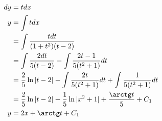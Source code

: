 \begin{align*}
    dy & = tdx                                                                          \\
    y  & = \int t dx                                                                    \\
       & = \int \frac{tdt}{(1+t^2)(t-2)}                                                \\
       & = \int \frac{2dt}{5(t-2)} - \int \frac{2t-1}{5(t^2+1)}dt                       \\
       & = \frac{2}{5}\ln|t-2| - \int \frac{2t}{5(t^2+1)}dt + \int \frac{1}{5(t^2+1)}dt \\
       & = \frac{2}{5}\ln|t-2| - \frac{1}{5}\ln|x^2+1| + \frac{\arctg t}{5} + C_1       \\
    y  & = 2x + \arctg t + C_1
\end{align*}






